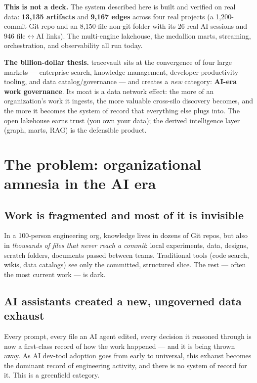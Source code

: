 \documentclass[11pt]{article}
\newcommand{\kw}[1]{\textcolor{tvaccent}{\textbf{#1}}}
\newcommand{\callout}[1]{%
  \par\vspace{0.4em}\noindent\colorbox{tvlight}{\parbox{\dimexpr\linewidth-2\fboxsep}{\vspace{0.2em}#1\vspace{0.2em}}}\par\vspace{0.5em}}
\begin{document}
\callout{\textbf{This is not a deck.} The system described here is built and verified on real data:
\textbf{13{,}135 artifacts} and \textbf{9{,}167 edges} across four real projects (a 1{,}200-commit
Git repo and an 8{,}150-file non-git folder with its 26 real AI sessions and 946 file$\leftrightarrow$AI
links). The multi-engine lakehouse, the medallion marts, streaming, orchestration, and observability
all run today.}

\textbf{The billion-dollar thesis.} tracevault sits at the convergence of four large markets ---
enterprise search, knowledge management, developer-productivity tooling, and data catalog/governance
--- and creates a \emph{new} category: \kw{AI-era work governance}. Its moat is a data network effect:
the more of an organization's work it ingests, the more valuable cross-silo discovery becomes, and the
more it becomes the system of record that everything else plugs into. The open lakehouse earns trust
(you own your data); the derived intelligence layer (graph, marts, RAG) is the defensible product.

\section{The problem: organizational amnesia in the AI era}

\subsection{Work is fragmented and most of it is invisible}
In a 100-person engineering org, knowledge lives in dozens of Git repos, but also in \emph{thousands
of files that never reach a commit}: local experiments, data, designs, scratch folders, documents
passed between teams. Traditional tools (code search, wikis, data catalogs) see only the committed,
structured slice. The rest --- often the most current work --- is dark.

\subsection{AI assistants created a new, ungoverned data exhaust}
Every prompt, every file an AI agent edited, every decision it reasoned through is now a first-class
record of how the work happened --- and it is being thrown away. As AI dev-tool adoption goes from
early to universal, this exhaust becomes the dominant record of engineering activity, and there is no
system of record for it. This is a greenfield category.
\end{document}
